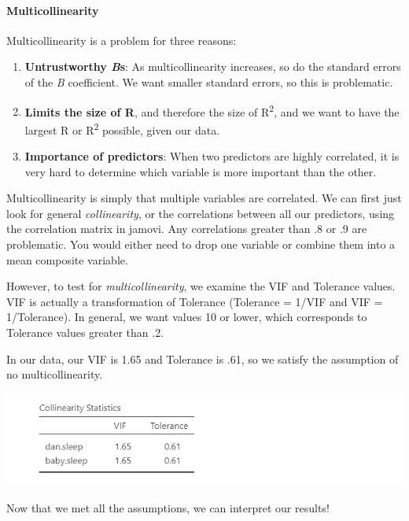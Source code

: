\documentclass[
]{book}
\providecommand{\tightlist}{%
  \setlength{\itemsep}{0pt}\setlength{\parskip}{0pt}}
\begin{document}
\hypertarget{multicollinearity}{%
\paragraph{Multicollinearity}\label{multicollinearity}}

Multicollinearity is a problem for three reasons:

\begin{enumerate}
\def\labelenumi{\arabic{enumi}.}
\tightlist
\item
  \textbf{Untrustworthy \emph{B}s}: As multicollinearity increases, so do the standard errors of the \emph{B} coefficient. We want smaller standard errors, so this is problematic.
\item
  \textbf{Limits the size of R}, and therefore the size of R\textsuperscript{2}, and we want to have the largest R or R\textsuperscript{2} possible, given our data.
\item
  \textbf{Importance of predictors}: When two predictors are highly correlated, it is very hard to determine which variable is more important than the other.
\end{enumerate}

Multicollinearity is simply that multiple variables are correlated. We can first just look for general \emph{collinearity}, or the correlations between all our predictors, using the correlation matrix in jamovi. Any correlations greater than .8 or .9 are problematic. You would either need to drop one variable or combine them into a mean composite variable.

However, to test for \emph{multicollinearity}, we examine the VIF and Tolerance values. VIF is actually a transformation of Tolerance (Tolerance = 1/VIF and VIF = 1/Tolerance). In general, we want values 10 or lower, which corresponds to Tolerance values greater than .2.

In our data, our VIF is 1.65 and Tolerance is .61, so we satisfy the assumption of no multicollinearity.

\includegraphics{images/13-regression/regression-multicollinearity.png}

Now that we met all the assumptions, we can interpret our results!
\end{document}
